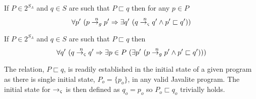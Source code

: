 \begin{corollary}
If $P \in 2^{S_\mathit{A}}$ and $q \in S$ are such that $P \sqsubset q$ then for any $p \in P$
$$
\forall p^\prime\ (p \stackrel{n}{\rightarrow_{g}} p^\prime \Rightarrow \exists q^\prime\ (q \stackrel{n}{\rightarrow_{\varsigma}} q^\prime \wedge p^\prime \sqsubset q^\prime))
$$
\end{corollary}

\begin{corollary}
If $P \in 2^{S_\mathit{A}}$ and $q \in S$ are such that $P \sqsubset q$ then
$$
\forall q^\prime\ (q \stackrel{n}{\rightarrow_{\varsigma}} q^\prime \Rightarrow \exists p \in P\ (\exists p^\prime\ (p \stackrel{n}{\rightarrow_{g}} p^\prime \wedge p^\prime \sqsubset q^\prime)))
$$
\end{corollary}

The relation, $P \sqsubset q$, is readily established in the initial
state of a given program as there is single initial state, $P_o =
\{p_o\}$, in any valid Javalite program. The initial state for $\rightarrow_{\varsigma}$ is
then defined as $q_o = p_o$ so $P_o \sqsubset q_o$ trivially holds.
